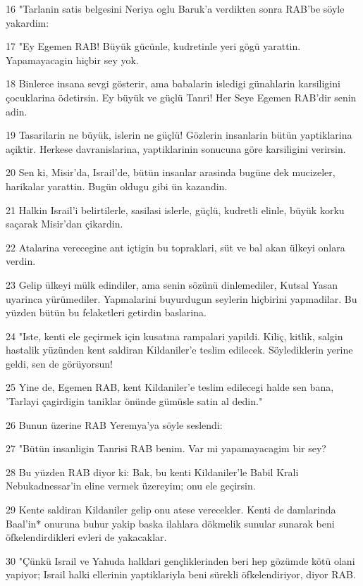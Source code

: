 \par 16 "Tarlanin satis belgesini Neriya oglu Baruk'a verdikten sonra RAB'be söyle yakardim:
\par 17 "Ey Egemen RAB! Büyük gücünle, kudretinle yeri gögü yarattin. Yapamayacagin hiçbir sey yok.
\par 18 Binlerce insana sevgi gösterir, ama babalarin isledigi günahlarin karsiligini çocuklarina ödetirsin. Ey büyük ve güçlü Tanri! Her Seye Egemen RAB'dir senin adin.
\par 19 Tasarilarin ne büyük, islerin ne güçlü! Gözlerin insanlarin bütün yaptiklarina açiktir. Herkese davranislarina, yaptiklarinin sonucuna göre karsiligini verirsin.
\par 20 Sen ki, Misir'da, Israil'de, bütün insanlar arasinda bugüne dek mucizeler, harikalar yarattin. Bugün oldugu gibi ün kazandin.
\par 21 Halkin Israil'i belirtilerle, sasilasi islerle, güçlü, kudretli elinle, büyük korku saçarak Misir'dan çikardin.
\par 22 Atalarina verecegine ant içtigin bu topraklari, süt ve bal akan ülkeyi onlara verdin.
\par 23 Gelip ülkeyi mülk edindiler, ama senin sözünü dinlemediler, Kutsal Yasan uyarinca yürümediler. Yapmalarini buyurdugun seylerin hiçbirini yapmadilar. Bu yüzden bütün bu felaketleri getirdin baslarina.
\par 24 "Iste, kenti ele geçirmek için kusatma rampalari yapildi. Kiliç, kitlik, salgin hastalik yüzünden kent saldiran Kildaniler'e teslim edilecek. Söylediklerin yerine geldi, sen de görüyorsun!
\par 25 Yine de, Egemen RAB, kent Kildaniler'e teslim edilecegi halde sen bana, 'Tarlayi çagirdigin taniklar önünde gümüsle satin al dedin."
\par 26 Bunun üzerine RAB Yeremya'ya söyle seslendi:
\par 27 "Bütün insanligin Tanrisi RAB benim. Var mi yapamayacagim bir sey?
\par 28 Bu yüzden RAB diyor ki: Bak, bu kenti Kildaniler'le Babil Krali Nebukadnessar'in eline vermek üzereyim; onu ele geçirsin.
\par 29 Kente saldiran Kildaniler gelip onu atese verecekler. Kenti de damlarinda Baal'in* onuruna buhur yakip baska ilahlara dökmelik sunular sunarak beni öfkelendirdikleri evleri de yakacaklar.
\par 30 "Çünkü Israil ve Yahuda halklari gençliklerinden beri hep gözümde kötü olani yapiyor; Israil halki ellerinin yaptiklariyla beni sürekli öfkelendiriyor, diyor RAB.
